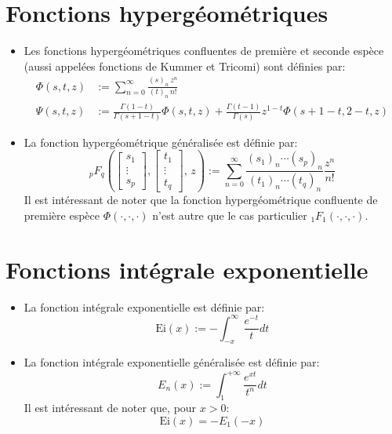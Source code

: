 \section*{Fonctions hypergéométriques}
\begin{itemize}
    \item Les fonctions hypergéométriques confluentes de première et seconde espèce (aussi appelées fonctions de Kummer et Tricomi) sont définies par:
    \[
        \begin{aligned}
            \Phi(s, t, z) &:= \sum_{n=0}^{\infty} \frac{{(s)}_n \, z^n}{{(t)}_n \, n!}  \\
            \Psi(s,t,z) &:= \frac{\Gamma(1-t)}{\Gamma(s+1-t)}\Phi(s,t,z)+\frac{\Gamma(t-1)}{\Gamma(s)}z^{1-t}\Phi(s+1-t,2-t,z)
        \end{aligned}
    \]
    \item La fonction hypergéométrique généralisée est définie par:
    \[
    _p F_q\left(\begin{bmatrix}s_1\\\vdots\\s_p\end{bmatrix},\begin{bmatrix}t_1\\\vdots\\t_q\end{bmatrix},\,z\right):=\sum_{n=0}^\infty\frac{{(s_1)}_n\cdots{(s_p)}_n}{{(t_1)}_n\cdots {(t_q)}_n}\frac{z^n}{n!}
    \]
    Il est intéressant de noter que la fonction hypergéométrique confluente de première espèce $\Phi(\cdot,\cdot,\cdot)$ n'est autre que le cas particulier $_1F_1(\cdot,\cdot,\cdot)$.
\end{itemize}
\section*{Fonctions intégrale exponentielle}
\begin{itemize}
    \item La fonction intégrale exponentielle est définie par:
    \[
    \text{Ei}(x):=-\int^{\infty}_{-x}\frac{e^{-t}}{t}dt
    \]
    \item La fonction intégrale exponentielle généralisée est définie par:
    \[
    E_n(x):=\int_1^{+\infty}\frac{e^{xt}}{t^n}dt
    \]
    Il est intéressant de noter que, pour $x>0$:
    \[\text{Ei}(x)=-E_1(-x)\]
\end{itemize}

